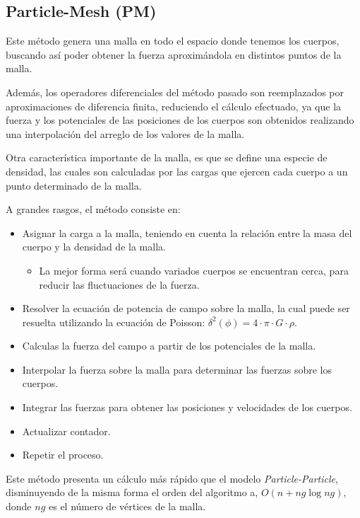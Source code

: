 \subsection{Particle-Mesh (PM)}

Este método genera una malla en todo el espacio donde tenemos los cuerpos,
buscando así poder obtener la fuerza aproximándola en distintos
puntos de la malla.

Además, los operadores diferenciales del método pasado son reemplazados por
aproximaciones de diferencia finita, reduciendo el cálculo efectuado,
ya que la fuerza y los potenciales de las posiciones de los cuerpos
son obtenidos realizando una interpolación del arreglo de
los valores de la malla.

Otra característica importante de la malla, es que se define una especie
de densidad, las cuales son calculadas por las cargas que ejercen
cada cuerpo a un punto determinado de la malla.

A grandes rasgos, el método consiste en:
\begin{itemize}
	\item Asignar la carga a la malla, teniendo en cuenta la relación entre
		la masa del cuerpo y la densidad de la malla.
		\begin{itemize}
			\item La mejor forma será cuando variados cuerpos se encuentran
				cerca, para reducir las fluctuaciones de la fuerza.
		\end{itemize}
	\item Resolver la ecuación de potencia de campo sobre la malla,
		la cual puede ser resuelta utilizando la ecuación de Poisson: $\delta^{2} (\phi) = 4\cdot \pi \cdot G \cdot \rho$.
	\item Calculas la fuerza del campo a partir de los potenciales de la malla.
	\item Interpolar la fuerza sobre la malla para determinar las fuerzas
		sobre los cuerpos.
	\item Integrar las fuerzas para obtener las posiciones y velocidades
		de los cuerpos.
	\item Actualizar contador.
	\item Repetir el proceso.
\end{itemize}

Este método presenta un cálculo más rápido que el modelo \emph{Particle-Particle},
disminuyendo de la misma forma el orden del algoritmo a, $O(n + ng \log ng)$,
donde $ng$ es el número de vértices de la malla.

